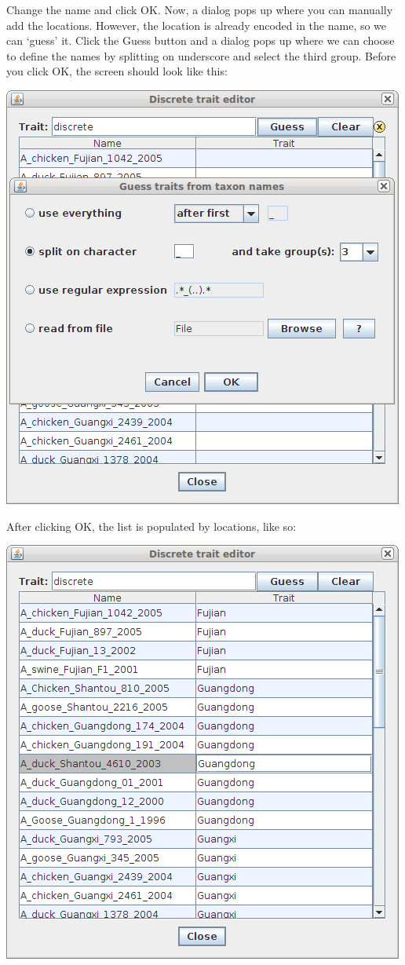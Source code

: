 \documentclass{article}
\begin{document}
Change the name and click OK. Now, a dialog pops up where you can manually add the locations. However, the location is already encoded in the name, so we can `guess' it. Click the Guess button and a dialog pops up where we can choose to define the names by splitting on underscore and select the third group. Before you click OK, the screen should look like this:

\includegraphics[scale=0.4,clip=true,trim=260 60 260 60]{figures/BEAUti_trait3.png}

After clicking OK, the list is populated by locations, like so:

\includegraphics[scale=0.4,clip=true,trim=260 60 260 60]{figures/BEAUti_trait4.png}
\end{document}
